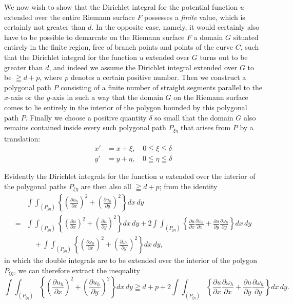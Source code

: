 \documentclass{article}
\begin{document}
We now wish to show that the Dirichlet integral for the potential function $u$ extended over the entire Riemann surface $F$ possesses a \emph{finite} value, which is certainly not greater than $d$. In the opposite case, namely, it would certainly also have to be possible to demarcate on the Riemann surface $F$ a domain $G$ situated entirely in the finite region, free of branch points and points of the curve $C$, such that the Dirichlet integral for the function $u$ extended over $G$ turns out to be greater than $d$, and indeed we assume the Dirichlet integral extended over $G$ to be $\geqq d+p$, where $p$ denotes a certain positive number. Then we construct a polygonal path $P$ consisting of a finite number of straight segments parallel to the $x$-axis or the $y$-axis in such a way that the domain $G$ on the Riemann surface comes to lie entirely in the interior of the polygon bounded by this polygonal path $P$. Finally we choose a positive quantity $\delta$ so small that the domain $G$ also remains contained inside every such polygonal path $P_{\xi\eta}$ that arises from $P$ by a translation:
\[
\begin{aligned}
x' &= x + \xi, \quad 0 \leqq \xi \leqq \delta \\
y' &= y + \eta, \quad 0 \leqq \eta \leqq \delta
\end{aligned}
\]

Evidently the Dirichlet integrals for the function $u$ extended over the interior of the polygonal paths $P_{\xi\eta}$ are then also all $\geqq d+p$; from the identity
\[
\begin{aligned}
&\int\!\!\int_{(P_{\xi\eta})} \left\{ \left(\frac{\partial u_h}{\partial x}\right)^2 + \left(\frac{\partial u_h}{\partial y}\right)^2 \right\} dx\,dy \\
= &\int\!\!\int_{(P_{\xi\eta})} \left\{ \left(\frac{\partial u}{\partial x}\right)^2 + \left(\frac{\partial u}{\partial y}\right)^2 \right\} dx\,dy + 2 \int\!\!\int_{(P_{\xi\eta})} \left\{ \frac{\partial u}{\partial x} \frac{\partial \omega_h}{\partial x} + \frac{\partial u}{\partial y} \frac{\partial \omega_h}{\partial y} \right\} dx\,dy \\
&\quad + \int\!\!\int_{(P_{\xi\eta})} \left\{ \left(\frac{\partial \omega_h}{\partial x}\right)^2 + \left(\frac{\partial \omega_h}{\partial y}\right)^2 \right\} dx\,dy,
\end{aligned}
\]
in which the double integrals are to be extended over the interior of the polygon $P_{\xi\eta}$, we can therefore extract the inequality
\[
\int\!\!\int_{(P_{\xi\eta})} \left\{ \left(\frac{\partial u_h}{\partial x}\right)^2 + \left(\frac{\partial u_h}{\partial y}\right)^2 \right\} dx\,dy \geqq d + p + 2 \int\!\!\int_{(P_{\xi\eta})} \left\{ \frac{\partial u}{\partial x} \frac{\partial \omega_h}{\partial x} + \frac{\partial u}{\partial y} \frac{\partial \omega_h}{\partial y} \right\} dx\,dy.
\]
\end{document}
